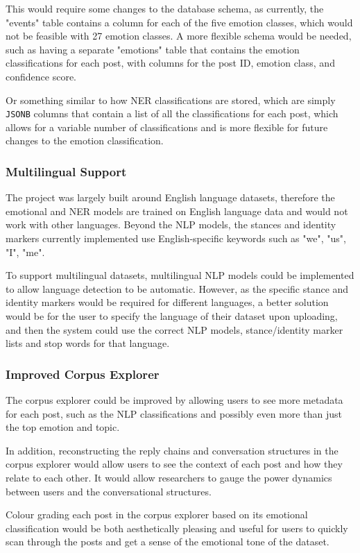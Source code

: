 \documentclass[12pt, a4paper]{article}
\begin{document}
This would require some changes to the database schema, as currently, the "events" table contains a column for each of the five emotion classes, which would not be feasible with 27 emotion classes. A more flexible schema would be needed, such as having a separate "emotions" table that contains the emotion classifications for each post, with columns for the post ID, emotion class, and confidence score. 

Or something similar to how NER classifications are stored, which are simply \texttt{JSONB} columns that contain a list of all the classifications for each post, which allows for a variable number of classifications and is more flexible for future changes to the emotion classification.

\subsubsection{Multilingual Support}
The project was largely built around English language datasets, therefore the emotional and NER models are trained on English language data and would not work with other languages. Beyond the NLP models, the stances and identity markers currently implemented use English-specific keywords such as "we", "us", "I", "me".

To support multilingual datasets, multilingual NLP models could be implemented to allow language detection to be automatic. However, as the specific stance and identity markers would be required for different languages, a better solution would be for the user to specify the language of their dataset upon uploading, and then the system could use the correct NLP models, stance/identity marker lists and stop words for that language.

\subsubsection{Improved Corpus Explorer}
The corpus explorer could be improved by allowing users to see more metadata for each post, such as the NLP classifications and possibly even more than just the top emotion and topic.

In addition, reconstructing the reply chains and conversation structures in the corpus explorer would allow users to see the context of each post and how they relate to each other. It would allow researchers to gauge the power dynamics between users and the conversational structures.

Colour grading each post in the corpus explorer based on its emotional classification would be both aesthetically pleasing and useful for users to quickly scan through the posts and get a sense of the emotional tone of the dataset.

\newpage

\end{document}
